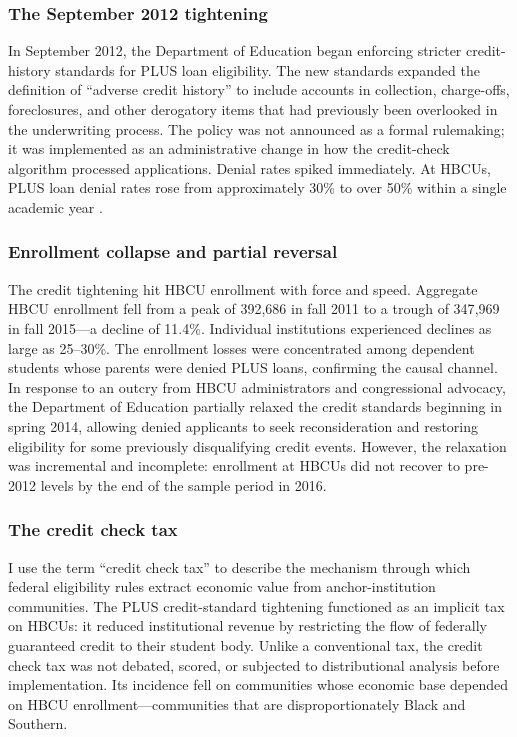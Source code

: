 \documentclass[12pt]{article}
\begin{document}
\subsubsection*{The September 2012 tightening} In September 2012, the Department of Education began enforcing stricter credit-history standards for PLUS loan eligibility. The new standards expanded the definition of ``adverse credit history'' to include accounts in collection, charge-offs, foreclosures, and other derogatory items that had previously been overlooked in the underwriting process. The policy was not announced as a formal rulemaking; it was implemented as an administrative change in how the credit-check algorithm processed applications. Denial rates spiked immediately. At HBCUs, PLUS loan denial rates rose from approximately 30\% to over 50\% within a single academic year \citep{johnson2015}.

\subsubsection*{Enrollment collapse and partial reversal} The credit tightening hit HBCU enrollment with force and speed. Aggregate HBCU enrollment fell from a peak of 392{,}686 in fall 2011 to a trough of 347{,}969 in fall 2015---a decline of 11.4\%. Individual institutions experienced declines as large as 25--30\%. The enrollment losses were concentrated among dependent students whose parents were denied PLUS loans, confirming the causal channel. In response to an outcry from HBCU administrators and congressional advocacy, the Department of Education partially relaxed the credit standards beginning in spring 2014, allowing denied applicants to seek reconsideration and restoring eligibility for some previously disqualifying credit events. However, the relaxation was incremental and incomplete: enrollment at HBCUs did not recover to pre-2012 levels by the end of the sample period in 2016.

\subsubsection*{The credit check tax} I use the term ``credit check tax'' to describe the mechanism through which federal eligibility rules extract economic value from anchor-institution communities. The PLUS credit-standard tightening functioned as an implicit tax on HBCUs: it reduced institutional revenue by restricting the flow of federally guaranteed credit to their student body. Unlike a conventional tax, the credit check tax was not debated, scored, or subjected to distributional analysis before implementation. Its incidence fell on communities whose economic base depended on HBCU enrollment---communities that are disproportionately Black and Southern.
\end{document}
